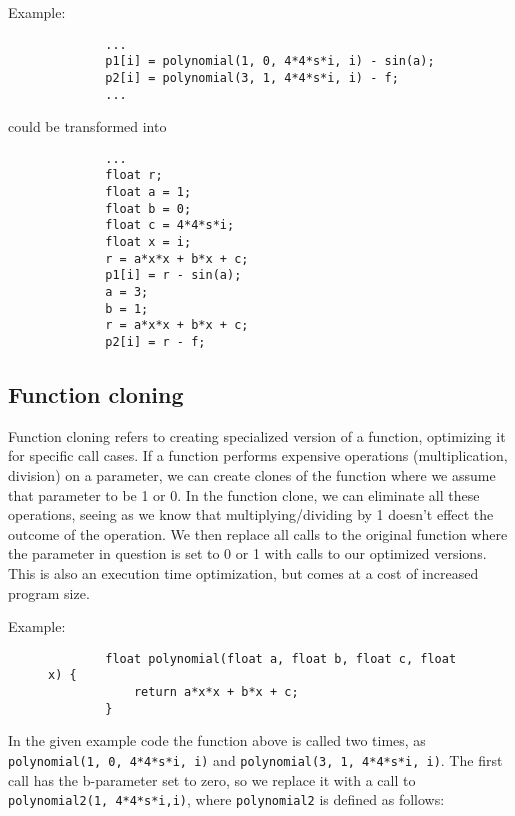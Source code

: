 \documentclass[twoside]{article}
\begin{document}
    Example:
    \begin{figure}[h]
        \centering
        \begin{verbatim}
        ...
        p1[i] = polynomial(1, 0, 4*4*s*i, i) - sin(a);
        p2[i] = polynomial(3, 1, 4*4*s*i, i) - f;
        ...
        \end{verbatim}
    \end{figure}

    could be transformed into

    \begin{figure}[h]
        \centering
        \begin{verbatim}
        ...
        float r;
        float a = 1;
        float b = 0;
        float c = 4*4*s*i;
        float x = i;
        r = a*x*x + b*x + c;
        p1[i] = r - sin(a);
        a = 3;
        b = 1;
        r = a*x*x + b*x + c;
        p2[i] = r - f;
        \end{verbatim}
    \end{figure}

    \subsection{Function cloning}

    Function cloning refers to creating specialized version of a function, optimizing it for specific call cases.
    If a function performs expensive operations (multiplication, division) on a parameter, we can create clones of the function where we assume that parameter to be 1 or 0.
    In the function clone, we can eliminate all these operations, seeing as we know that multiplying/dividing by 1 doesn't effect the outcome of the operation.
    We then replace all calls to the original function where the parameter in question is set to 0 or 1 with calls to our optimized versions.
    This is also an execution time optimization, but comes at a cost of increased program size.
    
    Example:
    \begin{figure}[h!]
        \centering
        \begin{verbatim}
        float polynomial(float a, float b, float c, float x) {
            return a*x*x + b*x + c;
        }
        \end{verbatim}
    \end{figure}
    
    In the given example code the function above is called two times, as \texttt{polynomial(1, 0, 4*4*s*i, i)} and \texttt{polynomial(3, 1, 4*4*s*i, i)}.
    The first call has the b-parameter set to zero, so we replace it with a call to \texttt{polynomial2(1, 4*4*s*i,i)}, where \texttt{polynomial2} is defined as follows:
\end{document}
